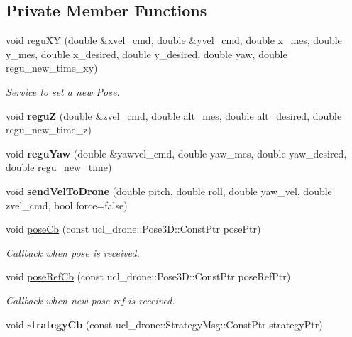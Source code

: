 \subsection*{Private Member Functions}
\begin{DoxyCompactItemize}
\item 
\mbox{\label{classBasicController_af14cd6cf6e4390b9fc54c58cd1036b0f}} 
void \hyperlink{classBasicController_af14cd6cf6e4390b9fc54c58cd1036b0f}{regu\+XY} (double \&xvel\+\_\+cmd, double \&yvel\+\_\+cmd, double x\+\_\+mes, double y\+\_\+mes, double x\+\_\+desired, double y\+\_\+desired, double yaw, double regu\+\_\+new\+\_\+time\+\_\+xy)
\begin{DoxyCompactList}\small\item\em Service to set a new Pose. \end{DoxyCompactList}\item 
\mbox{\label{classBasicController_a41e7e3652e12ff6f879fcf3268e247c3}} 
void {\bfseries reguZ} (double \&zvel\+\_\+cmd, double alt\+\_\+mes, double alt\+\_\+desired, double regu\+\_\+new\+\_\+time\+\_\+z)
\item 
\mbox{\label{classBasicController_ad7f78d2e47455d57df98999eb03f949f}} 
void {\bfseries regu\+Yaw} (double \&yawvel\+\_\+cmd, double yaw\+\_\+mes, double yaw\+\_\+desired, double regu\+\_\+new\+\_\+time)
\item 
\mbox{\label{classBasicController_a76cab83a59dc83a663c0407139f30ff3}} 
void {\bfseries send\+Vel\+To\+Drone} (double pitch, double roll, double yaw\+\_\+vel, double zvel\+\_\+cmd, bool force=false)
\item 
\mbox{\label{classBasicController_ae248e4bdec617baa60831ec3777efe26}} 
void \hyperlink{classBasicController_ae248e4bdec617baa60831ec3777efe26}{pose\+Cb} (const ucl\+\_\+drone\+::\+Pose3\+D\+::\+Const\+Ptr pose\+Ptr)
\begin{DoxyCompactList}\small\item\em Callback when pose is received. \end{DoxyCompactList}\item 
\mbox{\label{classBasicController_a07f9891bc885b23c46c73fb6e4f91d4e}} 
void \hyperlink{classBasicController_a07f9891bc885b23c46c73fb6e4f91d4e}{pose\+Ref\+Cb} (const ucl\+\_\+drone\+::\+Pose3\+D\+::\+Const\+Ptr pose\+Ref\+Ptr)
\begin{DoxyCompactList}\small\item\em Callback when new pose ref is received. \end{DoxyCompactList}\item 
\mbox{\label{classBasicController_a322ca98b3e291e1220231e126b916126}} 
void {\bfseries strategy\+Cb} (const ucl\+\_\+drone\+::\+Strategy\+Msg\+::\+Const\+Ptr strategy\+Ptr)
\end{DoxyCompactItemize}
